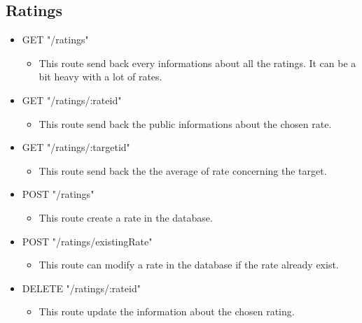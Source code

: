 \subsection{Ratings}
\begin{itemize}
	\item GET "/ratings"
	\begin{itemize}
		\item 	This route send back every informations about all the ratings. It can be a bit heavy with a lot of rates.
	\end{itemize}
\end{itemize}

\begin{itemize}
	\item GET "/ratings/:rateid"
	\begin{itemize}
		\item This route send back the public informations about the chosen rate.
	\end{itemize}
\end{itemize}

\begin{itemize}
	\item GET "/ratings/:targetid"
	\begin{itemize}
		\item This route send back the the average of rate concerning the target.
	\end{itemize}
\end{itemize}

\begin{itemize}
	\item POST "/ratings"
	\begin{itemize}
		\item This route create a rate in the database.
	\end{itemize}
\end{itemize}

\begin{itemize}
	\item POST "/ratings/existingRate"
	\begin{itemize}
		\item This route can modify a rate in the database if the rate already exist.
	\end{itemize}
\end{itemize}

\begin{itemize}
	\item DELETE "/ratings/:rateid"
	\begin{itemize}
		\item This route update the information about the chosen rating.
	\end{itemize}
\end{itemize}

